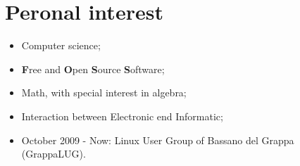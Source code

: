 \documentclass[pdftex, a4paper, 11pt]{article}
\begin{document}


\section*{Peronal interest}
\begin{itemize}
\item Computer science;
\item {\bf F}ree and {\bf O}pen {\bf S}ource {\bf S}oftware;
\item Math, with special interest in algebra;
\item Interaction between Electronic end Informatic;
\item October 2009 - Now: Linux User Group of Bassano del Grappa (GrappaLUG).
\end{itemize}
\end{document}
